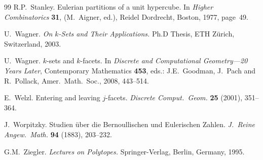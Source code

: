 \documentclass[10pt,a4paper]{article}
\theoremstyle{plain}
\begin{document}
\begin{thebibliography}{99}
{\sc R.P.\ Stanley.}
Eulerian partitions of a unit hypercube.
In \emph{Higher Combinatorics} {\bf 31}, (M.\ Aigner, ed.), Reidel Dordrecht, Boston, 1977, page~49.

{\sc U.\ Wagner.}
\emph{On $k$-Sets and Their Applications.}
Ph.D Thesis, ETH Z\"urich, Switzerland, 2003.   

{\sc U.\ Wagner.}
$k$-sets and $k$-facets.
In \emph{Discrete and Computational Geometry---20 Years Later}, Contemporary Mathematics {\bf 453}, eds.: J.E.\ Goodman, J.\ Pach and R.\ Pollack, Amer.\ Math.\ Soc., 2008, 443--514.

{\sc E.\ Welzl.}
Entering and leaving $j$-facets.
\emph{Discrete Comput.\ Geom.} {\bf 25} (2001), 351--364.

{\sc J.\ Worpitzky.}
Studien über die Bernoullischen und Eulerischen Zahlen.
\emph{J.\ Reine Angew.\ Math.} {\bf 94} (1883), 203--232.

{\sc G.M.\ Ziegler.}
\emph{Lectures on Polytopes.}
Springer-Verlag, Berlin, Germany, 1995.

\end{thebibliography}
\end{document}

